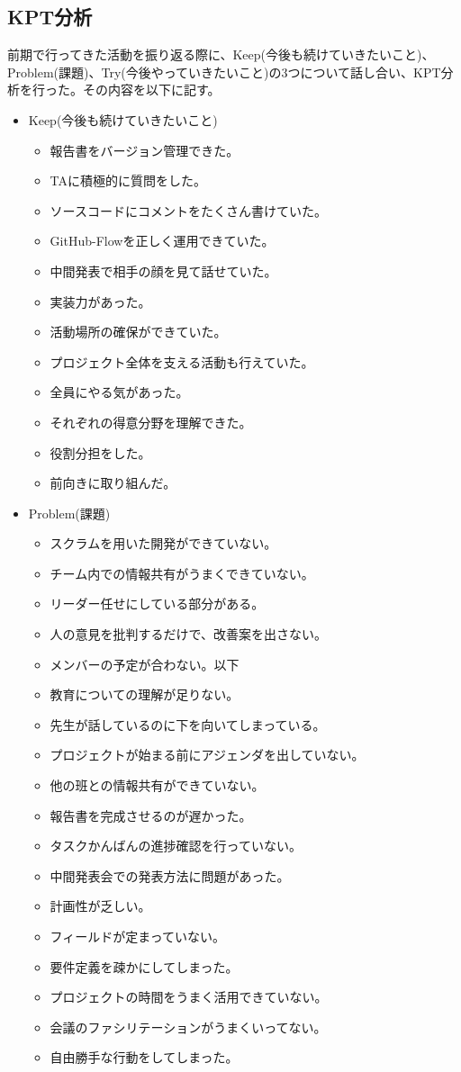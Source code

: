 \documentclass[openany,11pt,papersize]{jsbook}
\begin{document}
\subsection{KPT分析}
\par
前期で行ってきた活動を振り返る際に、Keep(今後も続けていきたいこと)、Problem(課題)、Try(今後やっていきたいこと)の3つについて話し合い、KPT分析を行った。その内容を以下に記す。
\begin{itemize}
\setlength{\itemsep}{5mm}

\item 
Keep(今後も続けていきたいこと)
\begin{itemize}
\item
報告書をバージョン管理できた。
\item
TAに積極的に質問をした。
\item
ソースコードにコメントをたくさん書けていた。
\item
GitHub-Flowを正しく運用できていた。
\item
中間発表で相手の顔を見て話せていた。
\item
実装力があった。
\item
活動場所の確保ができていた。
\item
プロジェクト全体を支える活動も行えていた。
\item
全員にやる気があった。
\item
それぞれの得意分野を理解できた。
\item
役割分担をした。
\item
前向きに取り組んだ。
\end{itemize}

\item 
Problem(課題)
\begin{itemize}
\item
スクラムを用いた開発ができていない。
\item
チーム内での情報共有がうまくできていない。
\item
リーダー任せにしている部分がある。
\item
人の意見を批判するだけで、改善案を出さない。
\item
メンバーの予定が合わない。以下
\item
教育についての理解が足りない。
\item
先生が話しているのに下を向いてしまっている。
\item
プロジェクトが始まる前にアジェンダを出していない。
\item
他の班との情報共有ができていない。
\item
報告書を完成させるのが遅かった。
\item
タスクかんばんの進捗確認を行っていない。
\item
中間発表会での発表方法に問題があった。
\item
計画性が乏しい。
\item
フィールドが定まっていない。
\item
要件定義を疎かにしてしまった。
\item
プロジェクトの時間をうまく活用できていない。
\item
会議のファシリテーションがうまくいってない。
\item
自由勝手な行動をしてしまった。
\end{itemize}


\end{itemize}
\end{document}
